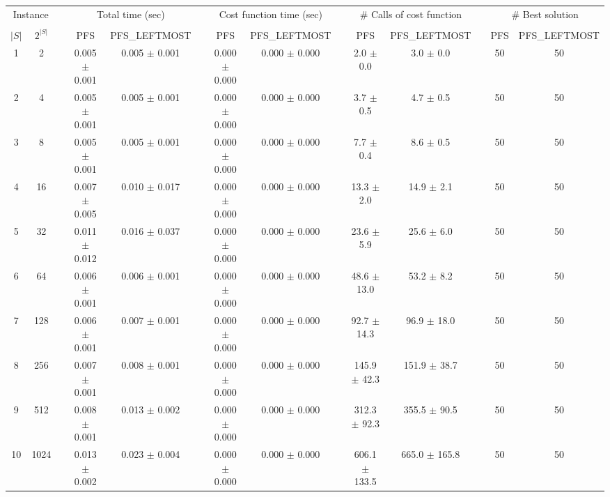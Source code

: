 \documentclass[11pt]{article}
\begin{document}
\begin{landscape}
\begin{table}
\centering
\footnotesize
\begin{tabular}{cccccccccccccc}
\toprule
\multicolumn{2}{c}{Instance} & \phantom{} & \multicolumn{2}{c}{Total time (sec)}  & \phantom{} & \multicolumn{2}{c}{Cost function time (sec)}  & \phantom{} & \multicolumn{2}{c}{\# Calls of cost function}  & \phantom{} & \multicolumn{2}{c}{\# Best solution}\\
\cline{1-2}\cline{4-5}\cline{7-8}\cline{10-11}\cline{13-14}\\
$|S|$ & $2^{|S|}$ && PFS & PFS_LEFTMOST && PFS & PFS_LEFTMOST && PFS & PFS_LEFTMOST && PFS & PFS_LEFTMOST \\
 1 &       2 &&  0.005 $\pm$ 0.001 & 0.005 $\pm$ 0.001 &&  0.000 $\pm$ 0.000 & 0.000 $\pm$ 0.000 &&   2.0 $\pm$  0.0 &  3.0 $\pm$  0.0 && 50& 50\\
 2 &       4 &&  0.005 $\pm$ 0.001 & 0.005 $\pm$ 0.001 &&  0.000 $\pm$ 0.000 & 0.000 $\pm$ 0.000 &&   3.7 $\pm$  0.5 &  4.7 $\pm$  0.5 && 50& 50\\
 3 &       8 &&  0.005 $\pm$ 0.001 & 0.005 $\pm$ 0.001 &&  0.000 $\pm$ 0.000 & 0.000 $\pm$ 0.000 &&   7.7 $\pm$  0.4 &  8.6 $\pm$  0.5 && 50& 50\\
 4 &      16 &&  0.007 $\pm$ 0.005 & 0.010 $\pm$ 0.017 &&  0.000 $\pm$ 0.000 & 0.000 $\pm$ 0.000 &&  13.3 $\pm$  2.0 & 14.9 $\pm$  2.1 && 50& 50\\
 5 &      32 &&  0.011 $\pm$ 0.012 & 0.016 $\pm$ 0.037 &&  0.000 $\pm$ 0.000 & 0.000 $\pm$ 0.000 &&  23.6 $\pm$  5.9 & 25.6 $\pm$  6.0 && 50& 50\\
 6 &      64 &&  0.006 $\pm$ 0.001 & 0.006 $\pm$ 0.001 &&  0.000 $\pm$ 0.000 & 0.000 $\pm$ 0.000 &&  48.6 $\pm$ 13.0 & 53.2 $\pm$  8.2 && 50& 50\\
 7 &     128 &&  0.006 $\pm$ 0.001 & 0.007 $\pm$ 0.001 &&  0.000 $\pm$ 0.000 & 0.000 $\pm$ 0.000 &&  92.7 $\pm$ 14.3 & 96.9 $\pm$ 18.0 && 50& 50\\
 8 &     256 &&  0.007 $\pm$ 0.001 & 0.008 $\pm$ 0.001 &&  0.000 $\pm$ 0.000 & 0.000 $\pm$ 0.000 &&  145.9 $\pm$ 42.3 & 151.9 $\pm$ 38.7 && 50& 50\\
 9 &     512 &&  0.008 $\pm$ 0.001 & 0.013 $\pm$ 0.002 &&  0.000 $\pm$ 0.000 & 0.000 $\pm$ 0.000 &&  312.3 $\pm$ 92.3 & 355.5 $\pm$ 90.5 && 50& 50\\
10 &    1024 &&  0.013 $\pm$ 0.002 & 0.023 $\pm$ 0.004 &&  0.000 $\pm$ 0.000 & 0.000 $\pm$ 0.000 &&  606.1 $\pm$ 133.5 & 665.0 $\pm$ 165.8 && 50& 50\\

\end{tabular}
\end{table}
\end{landscape}
\end{document}
